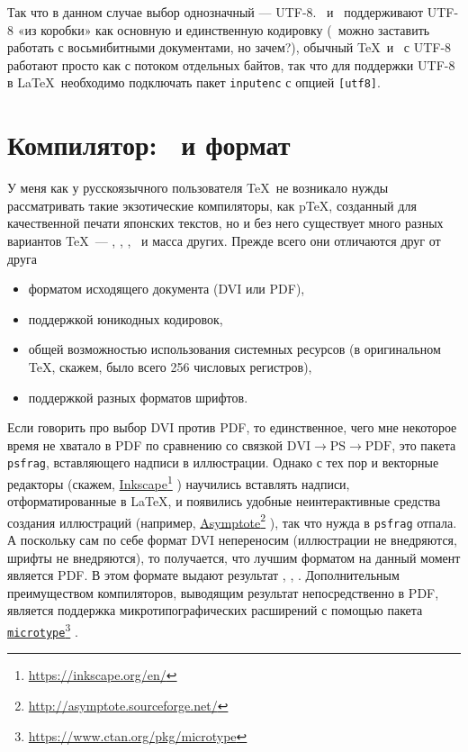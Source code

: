 \documentclass[a4paper,12pt]{article}
\newcommand\foothref[2]{%
  \href{#1}{#2}\footnote{\url{#1}}%
}
\newcommand\package[1]{\texttt{#1}}
\begin{document}
Так что в данном случае выбор однозначный --- UTF-8. \LuaTeX\ и \XeTeX\ поддерживают
UTF-8 «из коробки» как основную и единственную кодировку (\LuaLaTeX\ можно
заставить работать с восьмибитными документами, но зачем?), обычный \TeX\
и \pdfTeX\ с UTF-8 работают просто как с потоком отдельных байтов, так что
для поддержки UTF-8 в \LaTeX\ необходимо подключать пакет \package{inputenc}
с опцией \verb|[utf8]|.

\section{Компилятор: \LuaTeX\ и формат \LuaLaTeX}
У меня как у русскоязычного пользователя \TeX\ не возникало нужды рассматривать
такие экзотические компиляторы, как p\TeX, созданный для качественной печати японских
текстов, но и без него существует много разных вариантов \TeX\ --- \eTeX, \pdfTeX,
\XeTeX, \LuaTeX\ и масса других. Прежде всего они отличаются
друг от друга
\begin{itemize}
\item форматом исходящего документа (DVI или PDF),
\item поддержкой юникодных кодировок,
\item общей возможностью использования системных ресурсов (в оригинальном \TeX,
скажем, было всего 256 числовых регистров),
\item поддержкой разных форматов шрифтов.
\end{itemize}

Если говорить про выбор DVI против PDF, то единственное, чего мне некоторое время
не хватало в PDF по сравнению со связкой $\text{DVI}\to\text{PS}\to\text{PDF}$,
это пакета \package{psfrag}, вставляющего надписи в иллюстрации. Однако с тех
пор и векторные редакторы (скажем, \foothref{https://inkscape.org/en/}{Inkscape})
научились вставлять надписи,
отформатированные в \LaTeX, и появились удобные неинтерактивные средства создания
иллюстраций (например, \foothref{http://asymptote.sourceforge.net/}{Asymptote}),
так что нужда в \package{psfrag}
отпала. А поскольку сам по себе формат DVI непереносим (иллюстрации не
внедряются, шрифты не внедряются), то получается, что лучшим форматом на данный
момент является PDF. В этом формате выдают результат \pdfTeX, \XeTeX, \LuaTeX.
Дополнительным преимуществом компиляторов, выводящим результат непосредственно в PDF,
является поддержка микротипографических расширений с помощью пакета
\foothref{https://www.ctan.org/pkg/microtype}{\package{microtype}}.
\end{document}
